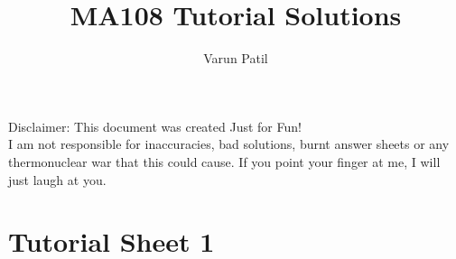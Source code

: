 \documentclass[a4paper]{article}
\title{MA108 Tutorial Solutions}
\author{Varun Patil}
\begin{document}
\maketitle 
\vspace{-8mm}
\begin{center}Disclaimer: This document was created Just for Fun!
\\I am not responsible for inaccuracies, bad solutions, burnt answer sheets or any thermonuclear war that this could cause. If you point your finger at me, I will just laugh at you.\end{center}

\section{Tutorial Sheet 1}
\renewcommand{\labelenumii}{(\roman{enumii})}
\end{document}
